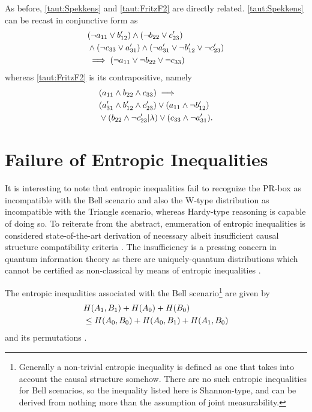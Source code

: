 \begin{EDITING...}
As before, \cref{taut:Spekkens} and \cref{taut:FritzF2} are directly related. \cref{taut:Spekkens} can be recast in conjunctive form as
\begin{align}\begin{split}
&\parens*{\na_{11} \lor b'_{12}} \land \parens*{\nb_{22} \lor c'_{23}} \\&\land \parens*{\nc_{33} \lor a'_{31}}\land\parens*{\na'_{31} \lor \nb'_{12} \lor \nc'_{23}}  \\&\implies \parens*{\na_{11} \lor \nb_{22} \lor \nc_{33}}
\end{split}\end{align}
whereas \cref{taut:FritzF2} is its contrapositive, namely 
\begin{align}\begin{split}
&\parens*{a_{11} \land b_{22} \land c_{33}} \implies\\& \parens*{a'_{31} \land b'_{12} \land c'_{23}} \lor \parens*{a_{11} \land \nb'_{12}} \\&\lor \parens*{b_{22} \land \nc'_{23}|\lambda} \lor \parens*{c_{33} \land \na'_{31}}.
\end{split}\end{align}

\section{Failure of Entropic Inequalities}

It is interesting to note that entropic inequalities \cite{fritz2013marginal,chaves2014novel} fail to recognize the PR-box as incompatible with the Bell scenario and also the W-type distribution as incompatible with the Triangle scenario, whereas Hardy-type reasoning is capable of doing so. To reiterate from the abstract, enumeration of entropic inequalities is considered state-of-the-art derivation of necessary albeit insufficient causal structure compatibility criteria \cite{pusey2014gdag}. The insufficiency is a pressing concern in quantum information theory as there are uniquely-quantum distributions which cannot be certified as non-classical by means of entropic inequalities \cite{fritz2012bell}. 

The entropic inequalities associated with the Bell scenario\footnote{Generally a non-trivial entropic inequality is defined as one that takes into account the causal structure somehow. There are no such entropic inequalities for Bell scenarios, so the inequality listed here is Shannon-type, and can be derived from nothing more than the assumption of joint measurability.} are given by
\begin{align}\begin{split}\label{eq:entropicCHSH}
&H\lparen A_1,B_1\rparen+H\lparen A_0\rparen+H\lparen B_0\rparen
\\&\leq H\lparen A_0,B_0\rparen+H\lparen A_0,B_1\rparen+H\lparen A_1,B_0\rparen
\end{split}\end{align}
and its permutations \cite{chaves2014novel,chaves2012entropic}.


\end{EDITING...}
